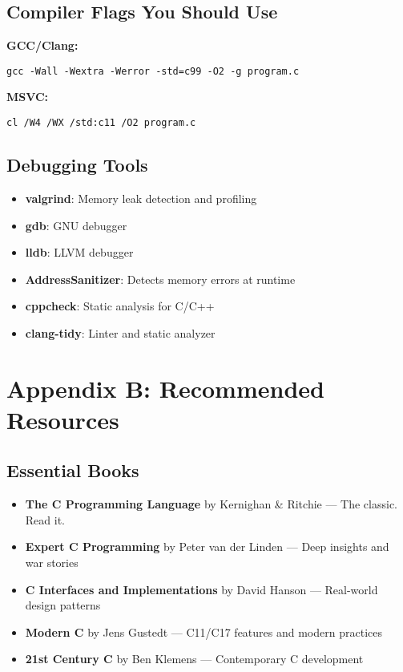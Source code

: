\documentclass[10pt,openany]{book}
\begin{document}
\section*{Compiler Flags You Should Use}

\textbf{GCC/Clang:}
\begin{verbatim}
gcc -Wall -Wextra -Werror -std=c99 -O2 -g program.c
\end{verbatim}

\textbf{MSVC:}
\begin{verbatim}
cl /W4 /WX /std:c11 /O2 program.c
\end{verbatim}

\section*{Debugging Tools}

\begin{itemize}
    \item \textbf{valgrind}: Memory leak detection and profiling
    \item \textbf{gdb}: GNU debugger
    \item \textbf{lldb}: LLVM debugger
    \item \textbf{AddressSanitizer}: Detects memory errors at runtime
    \item \textbf{cppcheck}: Static analysis for C/C++
    \item \textbf{clang-tidy}: Linter and static analyzer
\end{itemize}

\chapter{Appendix B: Recommended Resources}

\section*{Essential Books}

\begin{itemize}
    \item \textbf{The C Programming Language} by Kernighan \& Ritchie — The classic. Read it.
    \item \textbf{Expert C Programming} by Peter van der Linden — Deep insights and war stories
    \item \textbf{C Interfaces and Implementations} by David Hanson — Real-world design patterns
    \item \textbf{Modern C} by Jens Gustedt — C11/C17 features and modern practices
    \item \textbf{21st Century C} by Ben Klemens — Contemporary C development
\end{itemize}
\end{document}
